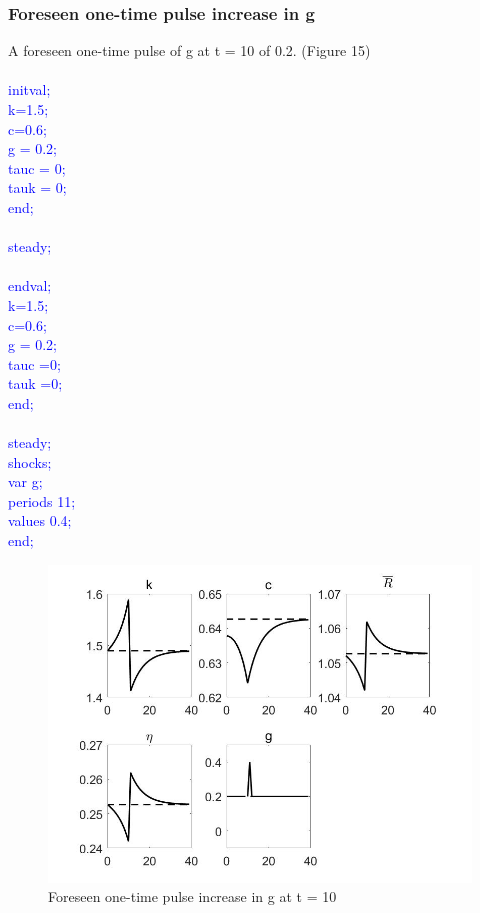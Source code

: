 \documentclass[a4paper,12pt]{scrartcl} %
\begin{document}
\subsubsection{Foreseen one-time pulse increase in g}

A foreseen one-time pulse of g at t = 10 of 0.2. (Figure 15)\\
\\
\textcolor{blue}{
initval;\\
k=1.5;\\
c=0.6;\\
g = 0.2;\\
tauc = 0;\\
tauk = 0;\\
end;\\
\\
steady;\\
\\
endval;\\
k=1.5;\\
c=0.6;\\
g = 0.2;\\
tauc =0;\\
tauk =0;\\
end;\\
\\
steady;\\
shocks;\\
var g;\\
periods 11;\\
values 0.4;\\
end;}\\

\begin{figure}[htbp!]
		\centering
			\includegraphics[width=0.8\linewidth]{fig15.jpg}
            \caption{Foreseen one-time pulse increase in g at t = 10}\label{15}
\end{figure}
\end{document}
